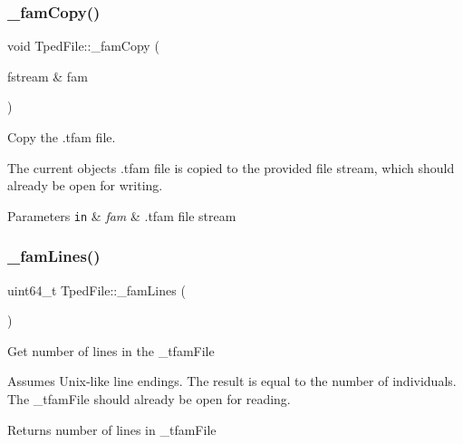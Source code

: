 \subsubsection{\texorpdfstring{\+\_\+fam\+Copy()}{\_famCopy()}}
{\footnotesize\ttfamily void Tped\+File\+::\+\_\+fam\+Copy (\begin{DoxyParamCaption}\item[{fstream \&}]{fam }\end{DoxyParamCaption})\hspace{0.3cm}{\ttfamily [protected]}}



Copy the .tfam file. 

The current object\textquotesingle{}s .tfam file is copied to the provided file stream, which should already be open for writing.


\begin{DoxyParams}[1]{Parameters}
\mbox{\tt in}  & {\em fam} & .tfam file stream \\
\hline
\end{DoxyParams}
\mbox{\label{classvarfiles_1_1_tped_file_af980d8b7900488c642980a5e59b5a379}} 
\subsubsection{\texorpdfstring{\+\_\+fam\+Lines()}{\_famLines()}\hspace{0.1cm}{\footnotesize\ttfamily [1/2]}}
{\footnotesize\ttfamily uint64\+\_\+t Tped\+File\+::\+\_\+fam\+Lines (\begin{DoxyParamCaption}{ }\end{DoxyParamCaption})\hspace{0.3cm}{\ttfamily [protected]}}



Get number of lines in the {\ttfamily \+\_\+tfam\+File} 

Assumes Unix-\/like line endings. The result is equal to the number of individuals. The {\ttfamily \+\_\+tfam\+File} should already be open for reading.

\begin{DoxyReturn}{Returns}
number of lines in {\ttfamily \+\_\+tfam\+File} 
\end{DoxyReturn}
\mbox{\label{classvarfiles_1_1_tped_file_a871c29be16893541ed02d8518808a301}} 
